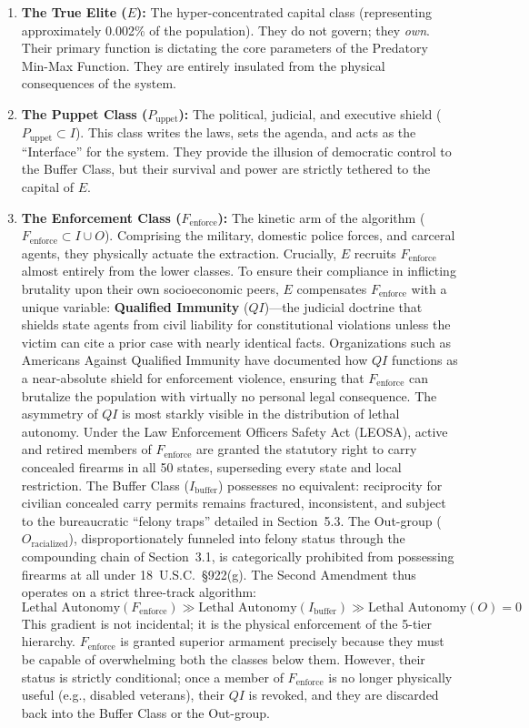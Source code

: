 \documentclass[12pt,openany]{book}
\begin{document}
\begin{enumerate}
    \item \textbf{The True Elite ($E$):} The hyper-concentrated capital class (representing approximately 0.002\% of the population). They do not govern; they \textit{own}. Their primary function is dictating the core parameters of the Predatory Min-Max Function. They are entirely insulated from the physical consequences of the system.

    \item \textbf{The Puppet Class ($P_{\text{uppet}}$):} The political, judicial, and executive shield ($P_{\text{uppet}} \subset I$). This class writes the laws, sets the agenda, and acts as the ``Interface'' for the system. They provide the illusion of democratic control to the Buffer Class, but their survival and power are strictly tethered to the capital of $E$.

    \item \textbf{The Enforcement Class ($F_{\text{enforce}}$):} The kinetic arm of the algorithm ($F_{\text{enforce}} \subset I \cup O$). Comprising the military, domestic police forces, and carceral agents, they physically actuate the extraction. Crucially, $E$ recruits $F_{\text{enforce}}$ almost entirely from the lower classes. To ensure their compliance in inflicting brutality upon their own socioeconomic peers, $E$ compensates $F_{\text{enforce}}$ with a unique variable: \textbf{Qualified Immunity} ($QI$)---the judicial doctrine that shields state agents from civil liability for constitutional violations unless the victim can cite a prior case with nearly identical facts. Organizations such as Americans Against Qualified Immunity have documented how $QI$ functions as a near-absolute shield for enforcement violence, ensuring that $F_{\text{enforce}}$ can brutalize the population with virtually no personal legal consequence. The asymmetry of $QI$ is most starkly visible in the distribution of lethal autonomy. Under the Law Enforcement Officers Safety Act (LEOSA), active and retired members of $F_{\text{enforce}}$ are granted the statutory right to carry concealed firearms in all 50 states, superseding every state and local restriction. The Buffer Class ($I_{\text{buffer}}$) possesses no equivalent: reciprocity for civilian concealed carry permits remains fractured, inconsistent, and subject to the bureaucratic ``felony traps'' detailed in Section~5.3. The Out-group ($O_{\text{racialized}}$), disproportionately funneled into felony status through the compounding chain of Section~3.1, is categorically prohibited from possessing firearms at all under 18~U.S.C.~\S922(g). The Second Amendment thus operates on a strict three-track algorithm:
    \[
    \text{Lethal Autonomy}(F_{\text{enforce}}) \gg \text{Lethal Autonomy}(I_{\text{buffer}}) \gg \text{Lethal Autonomy}(O) = 0
    \]
    This gradient is not incidental; it is the physical enforcement of the 5-tier hierarchy. $F_{\text{enforce}}$ is granted superior armament precisely because they must be capable of overwhelming both the classes below them. However, their status is strictly conditional; once a member of $F_{\text{enforce}}$ is no longer physically useful (e.g., disabled veterans), their $QI$ is revoked, and they are discarded back into the Buffer Class or the Out-group.


\end{enumerate}
\end{document}
